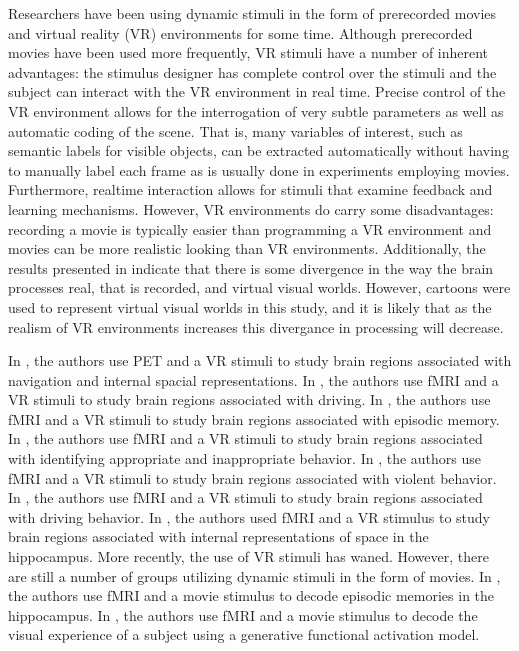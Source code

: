 \documentclass[preprint,5p,authoryear]{elsarticle}
\begin{document}
Researchers have been using dynamic stimuli in the form of prerecorded movies and virtual reality (VR) environments for some time.
Although prerecorded movies have been used more frequently, VR stimuli have a number of inherent advantages: the stimulus designer has complete control over the stimuli and the subject can interact with the VR environment in real time.
Precise control of the VR environment allows for the interrogation of very subtle parameters as well as automatic coding of the scene.
That is, many variables of interest, such as semantic labels for visible objects, can be extracted automatically without having to manually label each frame as is usually done in experiments employing movies.
Furthermore, realtime interaction allows for stimuli that examine feedback and learning mechanisms.
However, VR environments do carry some disadvantages: recording a movie is typically easier than programming a VR environment and movies can be more realistic looking than VR environments.
Additionally, the results presented in \cite{Han2005} indicate that there is some divergence in the way the brain processes real, that is recorded, and virtual visual worlds. 
However, cartoons were used to represent virtual visual worlds in this study, and it is likely that as the realism of VR environments increases this divergance in processing will decrease.

In \cite{Maguire1998}, the authors use PET and a VR stimuli to study brain regions associated with navigation and internal spacial representations. 
In \cite{Calhoun2002}, the authors use fMRI and a VR stimuli to study brain regions associated with driving.
In \cite{King2005}, the authors use fMRI and a VR stimuli to study brain regions associated with episodic memory.
In \cite{King2006}, the authors use fMRI and a VR stimuli to study brain regions associated with identifying appropriate and inappropriate behavior.
In \cite{Mathiak2006}, the authors use fMRI and a VR stimuli to study brain regions associated with violent behavior.
In \cite{Spiers2007a}, the authors use fMRI and a VR stimuli to study brain regions associated with driving behavior.
In \cite{Hassabis2009}, the authors used fMRI and a VR stimulus to study brain regions associated with internal representations of space in the hippocampus.
More recently, the use of VR stimuli has waned.
However, there are still a number of groups utilizing dynamic stimuli in the form of movies.
In \cite{Chadwick2010}, the authors use fMRI and a movie stimulus to decode episodic memories in the hippocampus.
In \cite{Nishimoto2011}, the authors use fMRI and a movie stimulus to decode the visual experience of a subject using a generative functional activation model.
\end{document}
